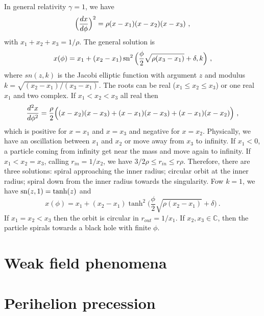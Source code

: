     In general relativity $\gamma = 1$, we have 
    \begin{equation*}
        \Big ( \frac{dx}{d\phi} \Big)^2 = \rho (x - x_1)(x-x_2)(x-x_3) ~,
    \end{equation*}
    with $x_1 + x_2 + x_3 = 1 / \rho$. The general solution is 
    \begin{equation*}
        x(\phi) = x_1 + (x_2 - x_1) \operatorname{sn}^2 \Big ( \frac{\phi}{2} \sqrt{\rho (x_3 - x_1)} + \delta, k \Big) ~,
    \end{equation*}
    where $sn(z, k)$ is the Jacobi elliptic function with argument $z$ and modulus $k = \sqrt{(x_2 - x_1)/(x_3 - x_1)}$. The roots can be real ($x_1 \leq x_2 \leq x_3$) or one real $x_1$ and two complex. If $x_1 < x_2 < x_3$ all real then 
    \begin{equation*}
        \frac{d^2x}{d\phi^2} = \frac{\rho}{2} \Big ( (x-x_2)(x-x_3) + (x-x_1)(x-x_3) + (x-x_1)(x-x_2) \Big) ~,
    \end{equation*}
    which is positive for $x = x_1$ and $x = x_3$ and negative for $x = x_2$. Physically, we have an oscillation between $x_1$ and $x_2$ or move away from $x_3$ to infinity. If $x_1 < 0$, a particle coming from infinity get near the mass and move again to infinity. 
    If $x_1 < x_2 = x_3$, calling $r_{in} = 1/x_2$, we have $3/2\rho \leq r_{in} \leq r \rho $. Therefore, there are three solutions: spiral approaching the inner radius; circular orbit at the inner radius; spiral down from the inner radius towards the singularity. Fow $k = 1$, we have $\operatorname{sn} (z, 1) = \tanh (z)$ and 
    \begin{equation*}
        x(\phi) = x_1 + (x_2 - x_1) \tanh^2 \Big (\frac{\phi}{2} \sqrt{\rho (x_2 - x_1)}+\delta) ~.
    \end{equation*}
    If $x_1 = x_2 < x_3$ then the orbit is circular in $r_{out} = 1/x_1$. If $x_2, x_3 \in \mathbb C$, then the particle spirals towards a black hole with finite $\phi$.

\section{Weak field phenomena}

\section{Perihelion precession}


